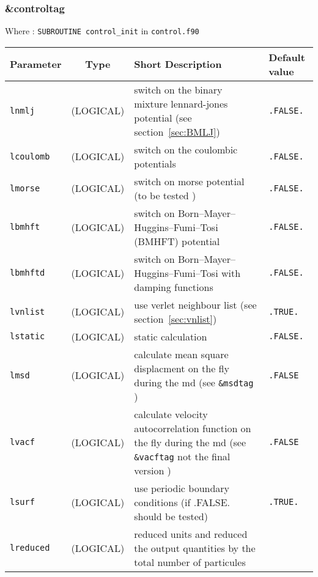 \documentclass[a4paper]{article}
\begin{document}
\subsubsection{\&controltag }

Where : \verb?SUBROUTINE control_init? in \verb?control.f90?
\newline

\begin{longtable}{l|c|m{8cm}|m{2cm}}
\hline
\hline
Parameter        &  Type              &          Short Description                                                          & Default value \\
\hline
\hline
\rule[-0.75cm]{0cm}{1.5cm}
\verb?lnmlj?     & (LOGICAL)          &  switch on the binary mixture lennard-jones potential (see section~\ref{sec:BMLJ})  & \verb?.FALSE.?  \\
\hline
\rule[-0.75cm]{0cm}{1.5cm}
\verb?lcoulomb?  & (LOGICAL)          &  switch on the coulombic potentials                                                 & \verb?.FALSE.? \\
\hline
\rule[-0.75cm]{0cm}{1.5cm}
\verb?lmorse?    & (LOGICAL)          &  switch on morse potential (to be tested )                                          & \verb?.FALSE.? \\
\hline
\rule[-0.75cm]{0cm}{1.5cm}
\verb?lbmhft?    & (LOGICAL)          &  switch on Born–Mayer–Huggins–Fumi–Tosi (BMHFT) potential                           & \verb?.FALSE.? \\
\hline
\rule[-0.75cm]{0cm}{1.5cm}
\verb?lbmhftd?   & (LOGICAL)          &  switch on Born–Mayer–Huggins–Fumi–Tosi  with damping functions                     & \verb?.FALSE.? \\
\hline
\rule[-0.75cm]{0cm}{1.5cm}
\verb?lvnlist?   & (LOGICAL)          &  use verlet neighbour list (see section~\ref{sec:vnlist})                           & \verb?.TRUE.?  \\
\hline
\rule[-0.75cm]{0cm}{1.5cm}
\verb?lstatic?   & (LOGICAL)          &  static calculation                                                                 & \verb?.FALSE.? \\
\hline
\rule[-0.75cm]{0cm}{1.5cm}
\verb?lmsd?      & (LOGICAL)          & calculate mean square displacment on the fly during the md (see \verb?&msdtag? )    & \verb?.FALSE? \\
\hline
\rule[-0.75cm]{0cm}{1.5cm}
\verb?lvacf?       & (LOGICAL)        & calculate velocity autocorrelation function on the fly during the md (see \verb?&vacftag? not the final version ) & \verb?.FALSE? \\
\hline
\rule[-0.75cm]{0cm}{1.5cm}
\verb?lsurf?     & (LOGICAL)          &  use periodic boundary conditions (if .FALSE. should be tested)                     & \verb?.TRUE.?  \\
\hline
\rule[-0.75cm]{0cm}{1.5cm}
\verb?lreduced?  & (LOGICAL)          &  \newline reduced units and reduced the output quantities by the total number of particules \newline


\end{longtable}
\end{document}
